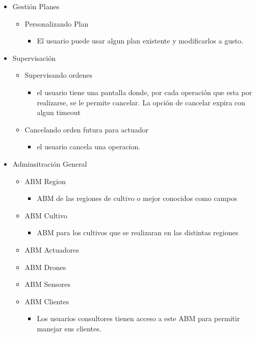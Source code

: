 \begin{itemize}
 \item Gesti\'on Planes
 \begin{itemize}
    \item Personalizando Plan
    \begin{itemize}
	\item El usuario puede usar algun plan existente y modificarlos a gusto.
    \end{itemize}
 \end{itemize}
 \item Supervisaci\'on
 \begin{itemize}
  \item Supervisando ordenes
  \begin{itemize}
    \item el usuario tiene una pantalla donde, por cada operaci\'on que esta por realizarse, se le permite cancelar. La opci\'on de cancelar expira con algun timeout 
  \end{itemize}
  \item Cancelando orden futura para actuador
  \begin{itemize}
    \item el usuario cancela una operacion.
  \end{itemize}
 \end{itemize} 
 \item Adminsitraci\'on General
 \begin{itemize}
    \item ABM Region 
    \begin{itemize}
	\item ABM de las regiones de cultivo o mejor conocidos como campos
    \end{itemize}
    \item ABM Cultivo
    \begin{itemize}
	\item ABM para los cultivos que se realizaran en las distintas regiones
    \end{itemize}
    \item ABM Actuadores
    \item ABM Drones
    \item ABM Sensores
    \item ABM Clientes
    \begin{itemize}
	\item Los usuarios consultores tienen acceso a este ABM para permitir manejar sus clientes.
    \end{itemize}
 \end{itemize}

\end{itemize}
